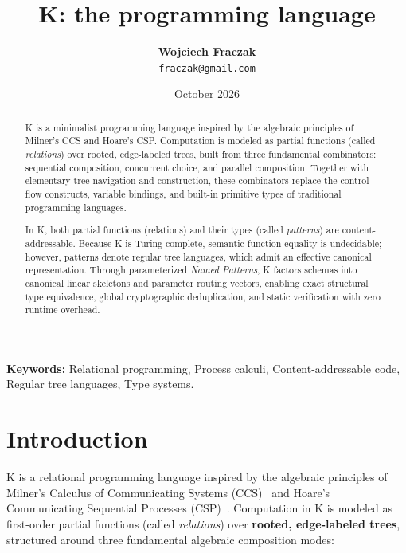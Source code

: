\documentclass[11pt,a4paper]{article}
\title{\textbf{K: the programming language}}
\author{
  \textbf{Wojciech Fraczak}\\
  \texttt{fraczak@gmail.com}
}
\date{October 2026}
\begin{document}
\maketitle

\begin{abstract}
K is a minimalist programming language inspired by the algebraic principles of Milner's CCS and Hoare's CSP. Computation is modeled as partial functions (called \emph{relations}) over rooted, edge-labeled trees, built from three fundamental combinators: sequential composition, concurrent choice, and parallel composition. Together with elementary tree navigation and construction, these combinators replace the control-flow constructs, variable bindings, and built-in primitive types of traditional programming languages.

In K, both partial functions (relations) and their types (called \emph{patterns}) are content-addressable. Because K is Turing-complete, semantic function equality is undecidable; however, patterns denote regular tree languages, which admit an effective canonical representation. Through parameterized \emph{Named Patterns}, K factors schemas into canonical linear skeletons and parameter routing vectors, enabling exact structural type equivalence, global cryptographic deduplication, and static verification with zero runtime overhead.
\end{abstract}

\vspace{0.5em}
\noindent\textbf{Keywords:} Relational programming, Process calculi, Content-addressable code, Regular tree languages, Type systems.

\vspace{1em}

\section{Introduction}

K is a relational programming language inspired by the algebraic principles of Milner's Calculus of Communicating Systems (CCS)~\cite{milner1989ccs} and Hoare's Communicating Sequential Processes (CSP)~\cite{hoare1985csp}. Computation in K is modeled as first-order partial functions (called \emph{relations}) over \textbf{rooted, edge-labeled trees}, structured around three fundamental algebraic composition modes:
\end{document}
